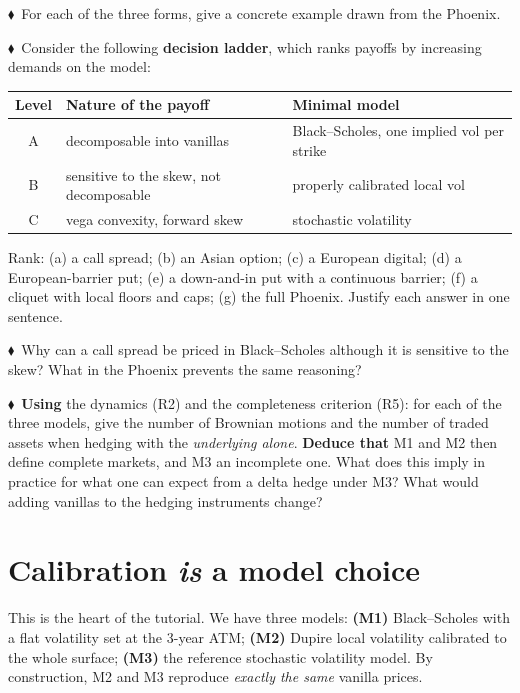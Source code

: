\documentclass[11pt,a4paper]{article}
\newcommand{\indiv}{\textcolor{indivred}{$\blacklozenge$}}
\begin{document}
\begin{questions}[resume]
  \item \indiv\ For each of the three forms, give a concrete example drawn from the Phoenix.

  \item \indiv\ Consider the following \textbf{decision ladder}, which ranks payoffs by increasing demands on the
  model:
  \begin{center}
  \small
  \begin{tabular}{@{}c l l@{}}
  \toprule
  Level & Nature of the payoff & Minimal model \\
  \midrule
  A & decomposable into vanillas & Black--Scholes, one implied vol per strike \\
  B & sensitive to the skew, not decomposable & properly calibrated local vol \\
  C & vega convexity, forward skew & stochastic volatility \\
  \bottomrule
  \end{tabular}
  \end{center}
  Rank: (a) a call spread; (b) an Asian option; (c) a European digital; (d) a European-barrier
  put; (e) a down-and-in put with a continuous barrier; (f) a cliquet with local floors and caps;
  (g) the full Phoenix. Justify each answer in one sentence.

  \item \indiv\ Why can a call spread be priced in Black--Scholes although it is sensitive to the skew? What
  in the Phoenix prevents the same reasoning?

  \item \indiv\ \textbf{Using} the dynamics (R2) and the completeness criterion (R5): for each of the three models,
  give the number of Brownian motions and the number of traded assets when hedging with
  the \emph{underlying alone}. \textbf{Deduce that} M1 and M2 then define complete markets, and M3 an
  incomplete one. What does this imply in practice for what one can expect from a delta hedge
  under M3? What would adding vanillas to the hedging instruments change?
\end{questions}

\section{Calibration \emph{is} a model choice}

This is the heart of the tutorial. We have three models: \textbf{(M1)} Black--Scholes with a flat volatility set
at the 3-year ATM; \textbf{(M2)} Dupire local volatility calibrated to the whole surface; \textbf{(M3)} the reference
stochastic volatility model. By construction, M2 and M3 reproduce \emph{exactly the same} vanilla prices.
\end{document}
